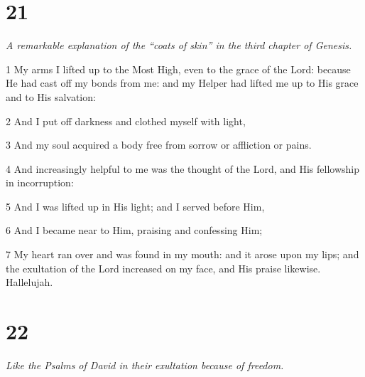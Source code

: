 \chapter{21}

\par \textit{A remarkable explanation of the “coats of skin” in the third chapter of Genesis.}

\par 1 My arms I lifted up to the Most High, even to the grace of the Lord: because He had cast off my bonds from me: and my Helper had lifted me up to His grace and to His salvation:
\par 2 And I put off darkness and clothed myself with light,
\par 3 And my soul acquired a body free from sorrow or affliction or pains.
\par 4 And increasingly helpful to me was the thought of the Lord, and His fellowship in incorruption:
\par 5 And I was lifted up in His light; and I served before Him,
\par 6 And I became near to Him, praising and confessing Him;
\par 7 My heart ran over and was found in my mouth: and it arose upon my lips; and the exultation of the Lord increased on my face, and His praise likewise. Hallelujah.

\chapter{22}

\par \textit{Like the Psalms of David in their exultation because of freedom.}

